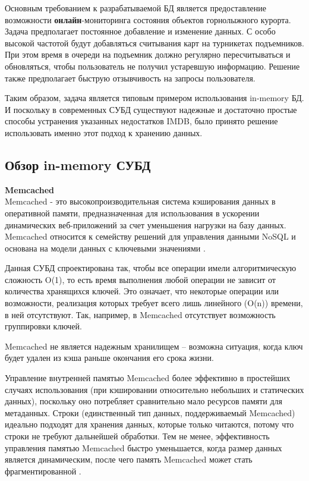 Основным требованием к разрабатываемой БД является предоставление возможности \textbf{онлайн}-мониторинга состояния объектов горнолыжного курорта. Задача предполагает постоянное добавление и изменение данных. С особо высокой частотой будут добавляться считывания карт на турникетах подъемников. При этом время в очереди на подъемник должно регулярно пересчитываться и обновляться, чтобы пользователь не получил устаревшую информацию. Решение также предполагает быструю отзывчивость на запросы пользователя.  

Таким образом, задача является типовым примером использования in-memory БД. И поскольку в современных СУБД существуют надежные и достаточно простые способы устранения указанных недостатков IMDB, было принято решение использовать именно этот подход к хранению данных.



\subsection{Обзор in-memory СУБД}

\noindent\textbf{Memcached}\\

Memcached - это высокопроизводительная система кэширования данных в оперативной памяти, предназначенная для использования в ускорении динамических веб-приложений за счет уменьшения нагрузки на базу данных. Memcached относится к семейству решений для управления данными NoSQL и основана на модели данных с ключевыми значениями  \cite{memcash}. 

Данная СУБД спроектирована так, чтобы все операции имели алгоритмическую сложность O(1), то есть время выполнения любой операции не зависит от количества хранящихся ключей. Это означает, что некоторые операции или возможности, реализация которых требует всего лишь линейного (O(n)) времени, в ней отсутствуют. Так, например, в Memcached отсутствует возможность группировки ключей.


Memcached не является надежным хранилищем – возможна ситуация, когда ключ будет удален из кэша раньше окончания его срока жизни. 

Управление внутренней памятью Memcached более эффективно в простейших случаях использования (при кэшировании относительно небольших и статических данных), поскольку оно потребляет сравнительно мало ресурсов памяти для метаданных. Строки (единственный тип данных, поддерживаемый Memcached) идеально подходят для хранения данных, которые только читаются, потому что строки не требуют дальнейшей обработки. Тем не менее, эффективность управления памятью Memcached быстро уменьшается, когда размер данных является динамическим, после чего память Memcached может стать фрагментированной \cite{memcash2}. 

